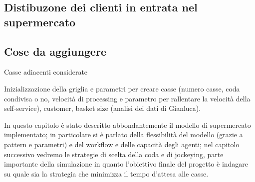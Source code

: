 \subsection{Distibuzone dei clienti in entrata nel supermercato}


\subsection{Cose da aggiungere}

Casse adiacenti considerate

Inizializzazione della griglia e parametri per creare casse (numero casse, coda condivisa o no, velocità di processing e parametro per rallentare la velocità della self-service), customer, basket size (analisi dei dati di Gianluca).

\vspace*{1\baselineskip}

In questo capitolo è stato descritto abbondantemente il modello di supermercato implementato; in particolare si è parlato della flessibilità del modello (grazie a pattern e parametri) e del workflow e delle capacità degli agenti; nel capitolo successivo vedremo le strategie di scelta della coda e di jockeying, parte importante della simulazione in quanto l'obiettivo finale del progetto è indagare su quale sia la strategia che minimizza il tempo d'attesa alle casse.